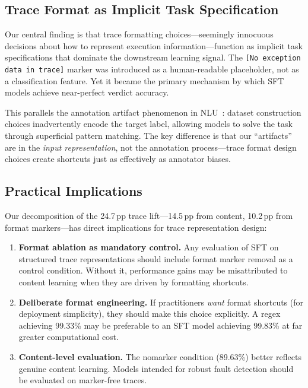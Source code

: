 \documentclass[11pt,a4paper]{article}
\newcommand{\pp}{\,\text{pp}}
\begin{document}
\subsection{Trace Format as Implicit Task Specification}

Our central finding is that trace formatting choices---seemingly innocuous decisions about how to represent execution information---function as implicit task specifications that dominate the downstream learning signal.
The \texttt{[No exception data in trace]} marker was introduced as a human-readable placeholder, not as a classification feature.
Yet it became the primary mechanism by which SFT models achieve near-perfect verdict accuracy.

This parallels the annotation artifact phenomenon in NLU~\cite{gururangan2018annotation}: dataset construction choices inadvertently encode the target label, allowing models to solve the task through superficial pattern matching.
The key difference is that our ``artifacts'' are in the \emph{input representation}, not the annotation process---trace format design choices create shortcuts just as effectively as annotator biases.

\subsection{Practical Implications}

Our decomposition of the 24.7$\pp$ trace lift---14.5$\pp$ from content, 10.2$\pp$ from format markers---has direct implications for trace representation design:

\begin{enumerate}
    \item \textbf{Format ablation as mandatory control.} Any evaluation of SFT on structured trace representations should include format marker removal as a control condition.
    Without it, performance gains may be misattributed to content learning when they are driven by formatting shortcuts.
    \item \textbf{Deliberate format engineering.} If practitioners \emph{want} format shortcuts (for deployment simplicity), they should make this choice explicitly.
    A regex achieving 99.33\% may be preferable to an SFT model achieving 99.83\% at far greater computational cost.
    \item \textbf{Content-level evaluation.} The nomarker condition (89.63\%) better reflects genuine content learning.
    Models intended for robust fault detection should be evaluated on marker-free traces.
\end{enumerate}
\end{document}
